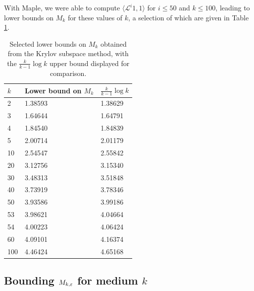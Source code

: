 With Maple, we were able to compute $\langle {\mathcal L}^i 1, 1 \rangle$ for $i \leq 50$ and $k \leq 100$, leading to lower bounds on $M_k$ for these values of $k$, a selection of which are given in Table \ref{tab}.

\begin{table}
\centering
 \caption{Selected lower bounds on $M_k$ obtained from the Krylov subspace method, with the $\frac{k}{k-1} \log k$ upper bound displayed for comparison.}
 \label{tab}
  \begin{tabular}{lll}
   \toprule
     $k$    & Lower bound on $M_k$   & $\frac{k}{k-1} \log k$   \\
   \midrule
           2 & 1.38593            & 1.38629                \\
           3 & 1.64644            & 1.64791              \\ [0.5ex]
           4 & 1.84540  	        & 1.84839             \\
           5 & 2.00714  	        & 2.01179             \\ [0.5ex]
          10 & 2.54547            & 2.55842              \\
				  20 & 3.12756            & 3.15340              \\  [0.5ex]
          30 & 3.48313            & 3.51848              \\
          40 & 3.73919            & 3.78346            \\  [0.5ex]
          50 & 3.93586            & 3.99186              \\
          53 & 3.98621            & 4.04664            \\  [0.5ex]
          54 & 4.00223            & 4.06424            \\
          60 & 4.09101            & 4.16374            \\  [0.5ex]
				 100 & 4.46424            & 4.65168           \\
   \bottomrule
  \end{tabular}
\end{table}


\subsection{Bounding \texorpdfstring{$M_{k,\varepsilon}$}{Mk,epsilon} for medium \texorpdfstring{$k$}{k}}\label{mkeps-sec}

